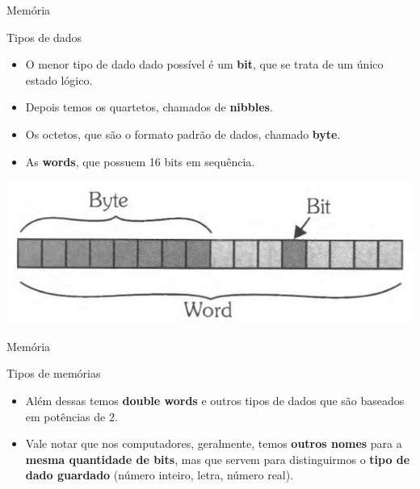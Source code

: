 \begin{frame}{Memória}
	\begin{block}{Tipos de dados}
		\begin{itemize}
			\item O menor tipo de dado dado possível é um \textbf{bit}, que se trata de um único estado lógico.
			\item Depois temos os quartetos, chamados de \textbf{nibbles}.
			\item Os octetos, que são o formato padrão de dados, chamado \textbf{byte}.
			\item As \textbf{words}, que possuem 16 bits em sequência.
		\end{itemize}
	\end{block}
	
	\centering
	
	\includegraphics[width=0.7\linewidth]{Figuras/Ch08/fig9}
	
\end{frame}


\begin{frame}{Memória}
	\begin{block}{Tipos de memórias}
		\begin{itemize}
			\item Além dessas temos \textbf{double words} e outros tipos de dados que são baseados em potências de 2.
			\item Vale notar que nos computadores, geralmente, temos \textbf{outros nomes} para a \textbf{mesma quantidade de bits}, mas que servem para distinguirmos o \textbf{tipo de dado guardado} (número inteiro, letra, número real).
		\end{itemize}
	\end{block}
	
	
	
\end{frame}


